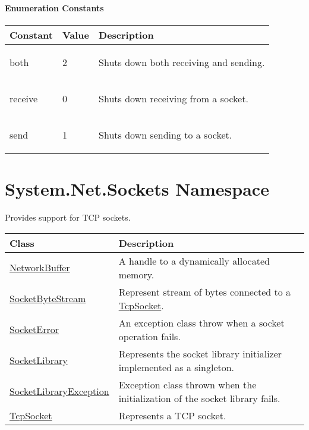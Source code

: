 \documentclass[a4paper,oneside,11.000000pt]{book}
\newcounter{subchapter}
\begin{document}
\subsubsection*{Enumeration Constants}
\begin{flushleft}
\begin{supertabular}[l]{lll}
\textbf{Constant}
& \textbf{Value}
& \textbf{Description}
\\
\hline
\hypertarget{ShutdownMode.both}{both}
& 2
& Shuts down both receiving and sending.

\\
\hypertarget{ShutdownMode.receive}{receive}
& 0
& Shuts down receiving from a socket.

\\
\hypertarget{ShutdownMode.send}{send}
& 1
& Shuts down sending to a socket.

\\
\end{supertabular}

\end{flushleft}
\clearpage

\hypertarget{System.Net.Sockets}{\chapter{System.Net.Sockets Namespace}}\begin{flushleft}
Provides support for TCP sockets.

\end{flushleft}
\clearpage

\begin{flushleft}
\begin{supertabular}[l]{!{\raggedright}p{5.56131cm}!{\raggedright}p{9.58869cm}}
\textbf{Class}
& \textbf{Description}
\\
\hline
\hyperlink{System.Net.Sockets.NetworkBuffer}{NetworkBuffer}
& A handle to a dynamically allocated memory.

\\
\hyperlink{System.Net.Sockets.SocketByteStream}{SocketByteStream}
& Represent stream of bytes connected to a \hyperlink{System.Net.Sockets.TcpSocket}{TcpSocket}.

\\
\hyperlink{System.Net.Sockets.SocketError}{SocketError}
& An exception class throw when a socket operation fails.

\\
\hyperlink{System.Net.Sockets.SocketLibrary}{SocketLibrary}
& Represents the socket library initializer implemented as a singleton.

\\
\hyperlink{System.Net.Sockets.SocketLibraryException}{SocketLibraryException}
& Exception class thrown when the initialization of the socket library fails.

\\
\hyperlink{System.Net.Sockets.TcpSocket}{TcpSocket}
& Represents a TCP socket.

\\
\end{supertabular}

\end{flushleft}
\clearpage
\end{document}
